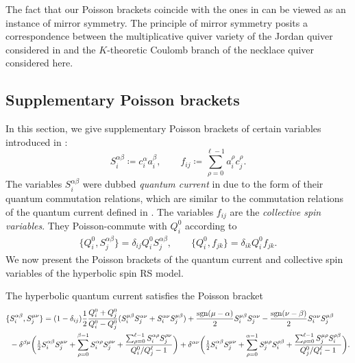 \begin{remark}
    The fact that our Poisson brackets coincide with the ones in \cite{arutyunov_hyperbolic_2019,fairon_compatible_2026} can be viewed as an instance of mirror symmetry. The principle of mirror symmetry posits a correspondence between the multiplicative quiver variety of the Jordan quiver considered in \cite{fairon_compatible_2026} and the $K$-theoretic Coulomb branch of the necklace quiver considered here.
\end{remark}

\subsection{Supplementary Poisson brackets}

In this section, we give supplementary Poisson brackets of certain variables introduced in \cite{arutyunov_hamiltonian_1998}:
\begin{equation}
    S_i^{\alpha\beta} \coloneq c_i^\alpha a_i^\beta, \qquad f_{ij} \coloneq \sum_{\rho=0}^{\ell-1} a_i^\rho c_j^\rho.
\end{equation}
The variables $S_i^{\alpha\beta}$ were dubbed \emph{quantum current} in \cite{arutyunov_quantized_2026} due to the form of their quantum commutation relations, which are similar to the commutation relations of the quantum current defined in \cite{reshetikhin_central_1990}. The variables $f_{ij}$ are the \emph{collective spin variables}. They Poisson-commute with $Q_i^0$ according to
\begin{eqnarray}
    \{ Q_i^0,S_j^{\alpha\beta} \} = \delta_{ij} Q_i^0 S_j^{\alpha\beta}, \qquad \{ Q_i^0,f_{jk} \} = \delta_{ik} Q_i^0 f_{jk}.
\end{eqnarray}
We now present the Poisson brackets of the quantum current and collective spin variables of the hyperbolic spin RS model.

\begin{prop}
    \def\a{\alpha}
    \def\b{\beta}
    \def\sgn{\rm sgn}
    The hyperbolic quantum current satisfies the Poisson bracket
    \begin{equation}
        \begin{aligned}
            \{&S_i^{\a\b},S_j^{\mu\nu}\}=(1-\delta_{ij})\frac{1}{2}\frac{Q^0_i+Q^0_j}{Q^0_i-Q^0_j}(S_i^{\mu\beta}S_j^{\a\nu}+S_i^{\a\nu}S_j^{\mu\beta})
            +\frac{\sgn(\mu-\a)}{2}S_i^{\mu\b}S_j^{\a\nu}-\frac{\sgn(\nu-\b)}{2}S_i^{\a\nu}S_j^{\mu\b}
            \\
            &
            -\delta^{\b\mu}\bigg(\tfrac{1}{2}S_i^{\a\b}S_j^{\mu\nu}+\sum_{\rho=0}^{\b-1}S_i^{\a\rho}S_j^{\rho\nu}+\frac{\sum_{\rho=0}^{\ell-1}S_i^{\a\rho}S_j^{\rho\nu}}{Q_i^0/Q_j^{\ell}-1} \bigg) 
            +\delta^{\a\nu}\bigg(\tfrac{1}{2}S_i^{\a\b}S_j^{\mu\nu}+\sum_{\rho=0}^{\a-1}S_j^{\mu\rho}S_i^{\rho\beta}+\frac{\sum_{\rho=0}^{\ell-1}S_j^{\mu\rho}S_i^{\rho\beta}}{Q_j^0/Q_i^{\ell}-1} \bigg).
        \end{aligned}
    \end{equation}
\end{prop}

